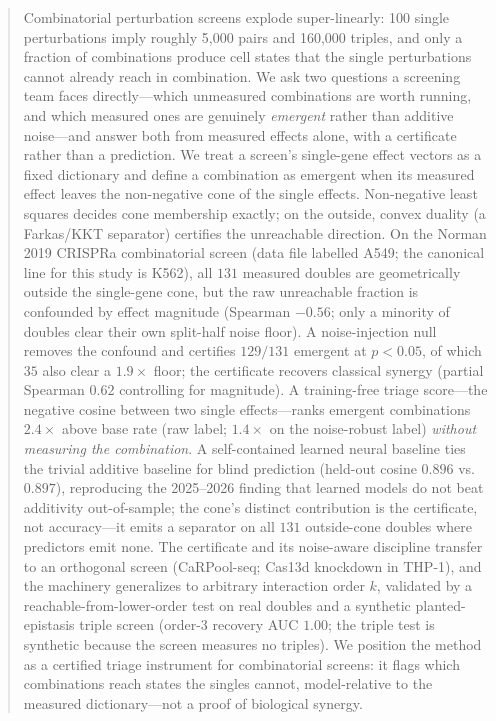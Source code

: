 \begin{abstract}
Combinatorial perturbation screens explode super-linearly: 100 single perturbations imply
roughly 5{,}000 pairs and 160{,}000 triples, and only a fraction of combinations produce
cell states that the single perturbations cannot already reach in combination. We ask two
questions a screening team faces directly---which unmeasured combinations are worth running,
and which measured ones are genuinely \emph{emergent} rather than additive noise---and answer
both from measured effects alone, with a certificate rather than a prediction. We treat a
screen's single-gene effect vectors as a fixed dictionary and define a combination as emergent
when its measured effect leaves the non-negative cone of the single effects. Non-negative
least squares decides cone membership exactly; on the outside, convex duality (a Farkas/KKT
separator) certifies the unreachable direction. On the Norman 2019 CRISPRa combinatorial
screen (data file labelled A549; the canonical line for this study is K562), all $131$ measured
doubles are geometrically outside the single-gene cone, but the raw unreachable fraction is
confounded by effect magnitude (Spearman $-0.56$; only a minority of doubles clear their own
split-half noise floor). A noise-injection null removes the confound and certifies $129/131$
emergent at $p<0.05$, of which $35$ also clear a $1.9\times$ floor; the certificate recovers
classical synergy (partial Spearman $0.62$ controlling for magnitude). A training-free triage
score---the negative cosine between two single effects---ranks emergent combinations $2.4\times$
above base rate (raw label; $1.4\times$ on the noise-robust label) \emph{without measuring the
combination}. A self-contained learned neural baseline ties the trivial additive baseline for
blind prediction (held-out cosine $0.896$ vs.\ $0.897$), reproducing the 2025--2026 finding
that learned models do not beat additivity out-of-sample; the cone's distinct contribution is
the certificate, not accuracy---it emits a separator on all $131$ outside-cone doubles where
predictors emit none. The certificate and its noise-aware discipline transfer to an orthogonal
screen (CaRPool-seq; Cas13d knockdown in THP-1), and the machinery generalizes to arbitrary
interaction order $k$, validated by a reachable-from-lower-order test on real doubles and a
synthetic planted-epistasis triple screen (order-3 recovery AUC $1.00$; the triple test is
synthetic because the screen measures no triples). We position the method as a certified triage
instrument for combinatorial screens: it flags which combinations reach states the singles
cannot, model-relative to the measured dictionary---not a proof of biological synergy.
\end{abstract}
